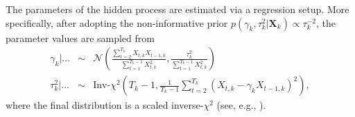 \documentclass[aoas, preprint]{imsart}
\numberwithin{equation}{section}
\theoremstyle{plain}
\begin{document}
\begin{center}
\end{center}
The parameters of the hidden process are estimated via a regression setup. More specifically, after adopting the non-informative prior $p(\gamma_k, \tau_k^2 | \boldsymbol{X}_k) \propto \tau_k^{-2}$, the parameter values are sampled from
\begin{eqnarray*}
\gamma_k | \dots  &\sim&  \mathcal{N} \left( \frac{\sum_{t=2}^{T_k} X_{t,k}X_{t-1,k}}{\sum_{t=1}^{T_k-1} X_{t,k}^2} , \frac{\tau_k^2}{\sum_{t=1}^{T_k-1} X_{t,k}^2} \right)\\
\tau_k^2 | \dots &\sim& \text{Inv-}\chi^2 \left(T_k-1, \frac{1}{T_k-1} \sum_{t=2}^{T_k} \left(X_{t,k} - \gamma_k X_{t-1,k} \right)^2 \right),
\end{eqnarray*}
where the final distribution is a scaled inverse-$\chi^2$ (see, e.g., \citet{gelman2003bayesian}).



\end{document}
